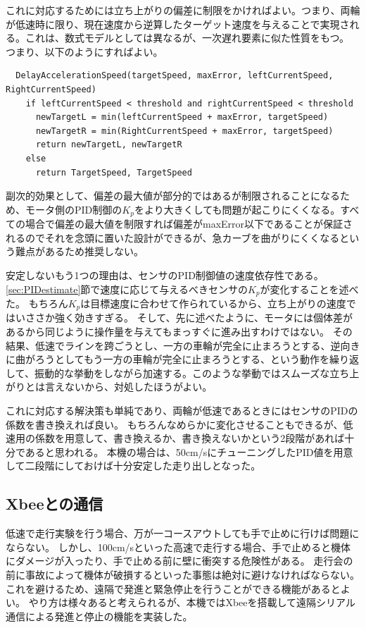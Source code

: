 \documentclass{ltjsreport}
\begin{document}
これに対応するためには立ち上がりの偏差に制限をかければよい。つまり、両輪が低速時に限り、現在速度から逆算したターゲット速度を与えることで実現される。これは、数式モデルとしては異なるが、一次遅れ要素に似た性質をもつ。
つまり、以下のようにすればよい。
\begin{verbatim}
  DelayAccelerationSpeed(targetSpeed, maxError, leftCurrentSpeed, RightCurrentSpeed)
    if leftCurrentSpeed < threshold and rightCurrentSpeed < threshold
      newTargetL = min(leftCurrentSpeed + maxError, targetSpeed)
      newTargetR = min(RightCurrentSpeed + maxError, targetSpeed)
      return newTargetL, newTargetR
    else
      return TargetSpeed, TargetSpeed
\end{verbatim}
副次的効果として、偏差の最大値が部分的ではあるが制限されることになるため、モータ側のPID制御の$K_p$をより大きくしても問題が起こりにくくなる。すべての場合で偏差の最大値を制限すれば偏差がmaxError以下であることが保証されるのでそれを念頭に置いた設計ができるが、急カーブを曲がりにくくなるという難点があるため推奨しない。

安定しないもう1つの理由は、センサのPID制御値の速度依存性である。
\ref{sec:PIDestimate}節で速度に応じて与えるべきセンサの$K_p$が変化することを述べた。
もちろん$K_p$は目標速度に合わせて作られているから、立ち上がりの速度ではいささか強く効きすぎる。
そして、先に述べたように、モータには個体差があるから同じように操作量を与えてもまっすぐに進み出すわけではない。
その結果、低速でラインを跨ごうとし、一方の車輪が完全に止まろうとする、逆向きに曲がろうとしてもう一方の車輪が完全に止まろうとする、という動作を繰り返して、振動的な挙動をしながら加速する。このような挙動ではスムーズな立ち上がりとは言えないから、対処したほうがよい。

これに対応する解決策も単純であり、両輪が低速であるときにはセンサのPIDの係数を書き換えれば良い。
もちろんなめらかに変化させることもできるが、低速用の係数を用意して、書き換えるか、書き換えないかという2段階があれば十分であると思われる。
本機の場合は、50cm/sにチューニングしたPID値を用意して二段階にしておけば十分安定した走り出しとなった。

\subsection{Xbeeとの通信}
低速で走行実験を行う場合、万が一コースアウトしても手で止めに行けば問題にならない。
しかし、100cm/sといった高速で走行する場合、手で止めると機体にダメージが入ったり、手で止める前に壁に衝突する危険性がある。
走行会の前に事故によって機体が破損するといった事態は絶対に避けなければならない。
これを避けるため、遠隔で発進と緊急停止を行うことができる機能があるとよい。
やり方は様々あると考えられるが、本機ではXbeeを搭載して遠隔シリアル通信による発進と停止の機能を実装した。
\end{document}
